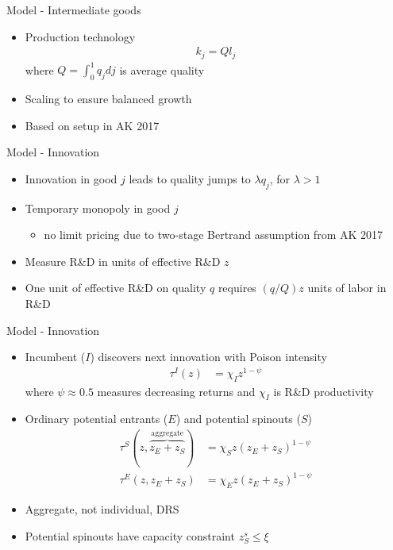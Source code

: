 \documentclass[english,usenames,dvipsnames]{beamer}
\begin{document}
\begin{frame}{Model - Intermediate goods}
\begin{itemize}
	\item Production technology
	\begin{align*}
	k_j = Q l_j
	\end{align*}
	where $Q = \int_0^1 q_j dj$ is average quality
	\item Scaling to ensure balanced growth
	\item Based on setup in AK 2017
\end{itemize}
\end{frame}

\begin{frame}{Model - Innovation}
\begin{itemize}
	\item Innovation in good $j$ leads to quality jumps to $\lambda q_j$, for $\lambda > 1$
	\item Temporary monopoly in good $j$
	\begin{itemize}
		\item no limit pricing due to two-stage Bertrand assumption from AK 2017
	\end{itemize}
	\item Measure R\&D in units of effective R\&D $z$
	\item One unit of effective R\&D on quality $q$ requires $(q/Q)z$ units of labor in R\&D
\end{itemize}
\end{frame}

\begin{frame}{Model - Innovation}
\begin{itemize}
	\item Incumbent ($I$) discovers next innovation with Poison intensity
	\begin{align*}
	\tau^I(z) &= \chi_I z^{1-\psi}
	\end{align*}
	where $\psi \approx 0.5$ measures decreasing returns and $\chi_I$ is R\&D productivity
	\item Ordinary potential entrants ($E$) and potential spinouts ($S$) 
	\begin{align*}
	\tau^S(z,\overbrace{z_E+z_S}^{\textrm{aggregate}}) &= \chi_{S} z (z_E + z_S)^{1-\psi} \\
	\tau^E(z,z_E+z_S) &= \chi_{E} z (z_E + z_S)^{1-\psi}
	\end{align*}
	\item Aggregate, not individual, DRS
	\item Potential spinouts have \alert{capacity constraint} $z_S^s \le \xi$
\end{itemize}
\end{frame}
\end{document}
